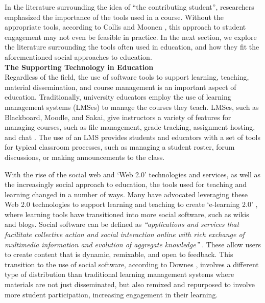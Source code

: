 In the literature surrounding the idea of ``the contributing student'', researchers emphasized the importance of the tools used in a course. Without the appropriate tools, according to Collis and Moonen \cite{collis2006contributing}, this approach to student engagement may not even be feasible in practice. In the next section, we explore the literature surrounding the tools often used in education, and how they fit the aforementioned social approaches to education. \\

\textbf{The Supporting Technology in Education} \\
Regardless of the field, the use of software tools to support learning, teaching, material dissemination, and course management is an important aspect of education. Traditionally, university educators employ the use of learning management systems (LMSes) to manage the courses they teach. LMSes, such as Blackboard, Moodle, and Sakai, give instructors a variety of features for managing courses, such as file management, grade tracking, assignment hosting, and chat \cite{kumar2011comparative}. The use of an LMS provides students and educators with a set of tools for typical classroom processes, such as managing a student roster, forum discussions, or making announcements to the class.

With the rise of the social web and `Web 2.0' technologies and services, as well as the increasingly social approach to education, the tools used for teaching and learning changed in a number of ways. Many have advocated leveraging these Web 2.0 technologies to support learning and teaching to create `e-learning 2.0' \cite{downes2005feature}, where learning tools have transitioned into more social software, such as wikis and blogs. Social software can be defined as \textit{``applications and services that facilitate collective action and social interaction online with rich exchange of multimedia information and evolution of aggregate knowledge''} \cite{parameswaran2007social}. These allow users to create content that is dynamic, remixable, and open to feedback. This transition to the use of social software, according to Downes \cite{downes2005feature}, involves a different type of distribution than traditional learning management systems where materials are not just disseminated, but also remixed and repurposed to involve more student participation, increasing engagement in their learning.

